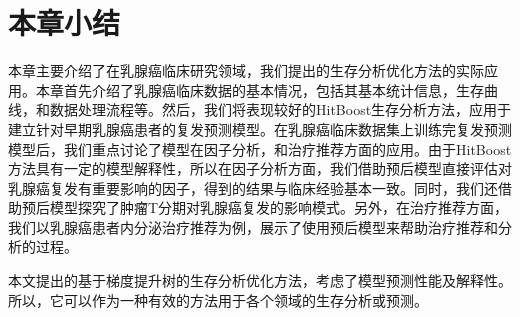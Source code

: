 \section{本章小结}

本章主要介绍了在乳腺癌临床研究领域，我们提出的生存分析优化方法的实际应用。本章首先介绍了乳腺癌临床数据的基本情况，包括其基本统计信息，生存曲线，和数据处理流程等。然后，我们将表现较好的HitBoost生存分析方法，应用于建立针对早期乳腺癌患者的复发预测模型。在乳腺癌临床数据集上训练完复发预测模型后，我们重点讨论了模型在因子分析，和治疗推荐方面的应用。由于HitBoost方法具有一定的模型解释性，所以在因子分析方面，我们借助预后模型直接评估对乳腺癌复发有重要影响的因子，得到的结果与临床经验基本一致。同时，我们还借助预后模型探究了肿瘤T分期对乳腺癌复发的影响模式。另外，在治疗推荐方面，我们以乳腺癌患者内分泌治疗推荐为例，展示了使用预后模型来帮助治疗推荐和分析的过程。
    
本文提出的基于梯度提升树的生存分析优化方法，考虑了模型预测性能及解释性。所以，它可以作为一种有效的方法用于各个领域的生存分析或预测。
